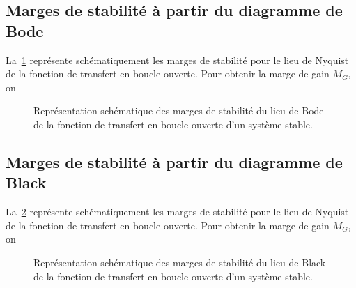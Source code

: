 \subsection{Marges de stabilité à partir du diagramme de Bode}
La~\cref{fig-bode_marges} représente schématiquement les marges 
de stabilité pour le lieu de Nyquist de la fonction de transfert en boucle
ouverte. Pour obtenir la marge de gain $M_G$, on
\begin{figure}[!h]
    \centering
    
    \caption{Représentation schématique des marges de stabilité du lieu de 
             Bode de la fonction de transfert en boucle ouverte d'un système
             stable. \label{fig-bode_marges}}
\end{figure}
\subsection{Marges de stabilité à partir du diagramme de Black}
La~\cref{fig-black_marges} représente schématiquement les marges 
de stabilité pour le lieu de Nyquist de la fonction de transfert en boucle
ouverte. Pour obtenir la marge de gain $M_G$, on
\begin{figure}[!h]
    \centering
    
    \caption{Représentation schématique des marges de stabilité du lieu de 
             Black de la fonction de transfert en boucle ouverte d'un système
             stable. \label{fig-black_marges}}
\end{figure}
\clearpage
